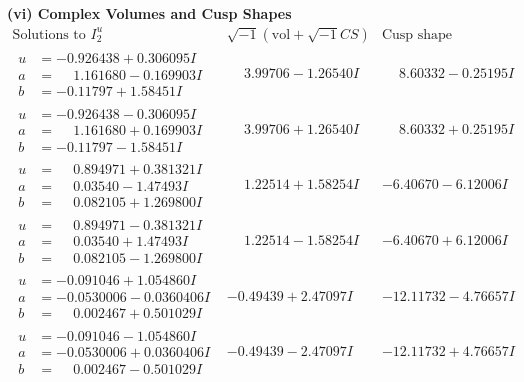 \documentclass[1p]{elsarticle_modified}
\theoremstyle{definition}
\newcommand{\I}{\sqrt{-1}}
\begin{document}
\newpage\flushleft \textbf{(vi) Complex Volumes and Cusp Shapes}
$$\begin{array}{c|c|c}  
\text{Solutions to }I^u_{2}& \I (\text{vol} + \sqrt{-1}CS) & \text{Cusp shape}\\
 \hline 
\begin{aligned}
u &= -0.926438 + 0.306095 I \\
a &= \phantom{-}1.161680 - 0.169903 I \\
b &= -0.11797 + 1.58451 I\end{aligned}
 & \phantom{-}3.99706 - 1.26540 I & \phantom{-}8.60332 - 0.25195 I \\ \hline\begin{aligned}
u &= -0.926438 - 0.306095 I \\
a &= \phantom{-}1.161680 + 0.169903 I \\
b &= -0.11797 - 1.58451 I\end{aligned}
 & \phantom{-}3.99706 + 1.26540 I & \phantom{-}8.60332 + 0.25195 I \\ \hline\begin{aligned}
u &= \phantom{-}0.894971 + 0.381321 I \\
a &= \phantom{-}0.03540 - 1.47493 I \\
b &= \phantom{-}0.082105 + 1.269800 I\end{aligned}
 & \phantom{-}1.22514 + 1.58254 I & -6.40670 - 6.12006 I \\ \hline\begin{aligned}
u &= \phantom{-}0.894971 - 0.381321 I \\
a &= \phantom{-}0.03540 + 1.47493 I \\
b &= \phantom{-}0.082105 - 1.269800 I\end{aligned}
 & \phantom{-}1.22514 - 1.58254 I & -6.40670 + 6.12006 I \\ \hline\begin{aligned}
u &= -0.091046 + 1.054860 I \\
a &= -0.0530006 - 0.0360406 I \\
b &= \phantom{-}0.002467 + 0.501029 I\end{aligned}
 & -0.49439 + 2.47097 I & -12.11732 - 4.76657 I \\ \hline\begin{aligned}
u &= -0.091046 - 1.054860 I \\
a &= -0.0530006 + 0.0360406 I \\
b &= \phantom{-}0.002467 - 0.501029 I\end{aligned}
 & -0.49439 - 2.47097 I & -12.11732 + 4.76657 I \\ \hline\begin{aligned}

\end{aligned}
\end{array}$$
\end{document}
